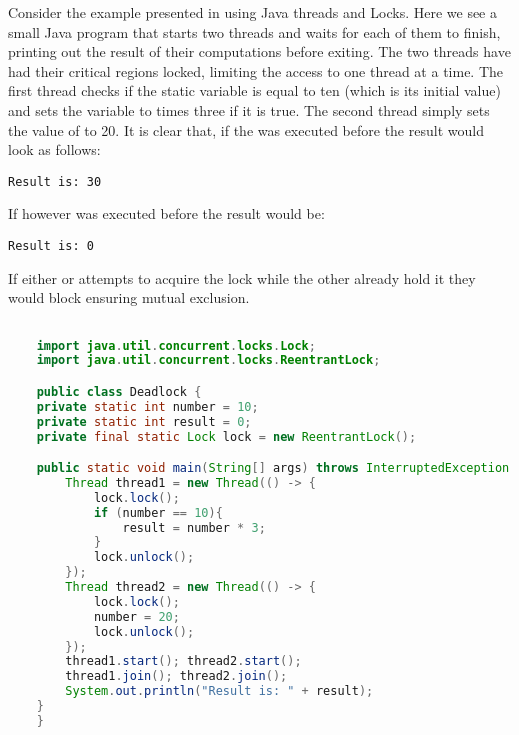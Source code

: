 Consider the example presented in  using Java threads and Locks. Here we see a small Java program that starts two threads and waits for each of them to finish, printing out the result of their computations before exiting. The two threads have had their critical regions locked, limiting the access to one thread at a time. The first thread checks if the static variable  is equal to ten (which is its initial value) and sets the  variable to  times three if it is true. The second thread simply sets the value of  to 20. It is clear that, if the  was executed before  the result would look as follows:
\begin{verbatim}
Result is: 30
\end{verbatim}
If however  was executed before  the result would be:
\begin{verbatim}
Result is: 0
\end{verbatim}
If either  or  attempts to acquire the lock while the other already hold it they would block ensuring mutual exclusion.

\begin{lstlisting}[float,label=lst:mutualexclusion,
  caption={Mutual exclusion in Java using a lock},
  language=Java,  
  showspaces=false,
  showtabs=false,
  breaklines=true,
  showstringspaces=false,
  breakatwhitespace=true,
  commentstyle=\color{greencomments},
  keywordstyle=\color{bluekeywords},
  stringstyle=\color{redstrings}]  % Start your code-block

	import java.util.concurrent.locks.Lock;
	import java.util.concurrent.locks.ReentrantLock;

	public class Deadlock {
    private static int number = 10;
    private static int result = 0;
    private final static Lock lock = new ReentrantLock();

    public static void main(String[] args) throws InterruptedException {
        Thread thread1 = new Thread(() -> {
            lock.lock();
            if (number == 10){
                result = number * 3;
            }
            lock.unlock();
        });
        Thread thread2 = new Thread(() -> {
            lock.lock();
            number = 20;
            lock.unlock();
        });
        thread1.start(); thread2.start();
        thread1.join(); thread2.join();
        System.out.println("Result is: " + result);
    }
	}
\end{lstlisting}

